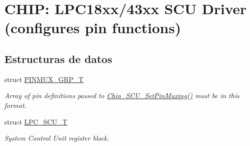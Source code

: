 \hypertarget{group___s_c_u__18_x_x__43_x_x}{}\section{C\+H\+IP\+: L\+P\+C18xx/43xx S\+CU Driver (configures pin functions)}
\label{group___s_c_u__18_x_x__43_x_x}
\subsection*{Estructuras de datos}
\begin{DoxyCompactItemize}
\item 
struct \hyperlink{struct_p_i_n_m_u_x___g_r_p___t}{P\+I\+N\+M\+U\+X\+\_\+\+G\+R\+P\+\_\+T}
\begin{DoxyCompactList}\small\item\em Array of pin definitions passed to \hyperlink{group___s_c_u__18_x_x__43_x_x_ga118ccc4ab5b115c5e8c7ce457eb85536}{Chip\+\_\+\+S\+C\+U\+\_\+\+Set\+Pin\+Muxing()} must be in this format. \end{DoxyCompactList}\item 
struct \hyperlink{struct_l_p_c___s_c_u___t}{L\+P\+C\+\_\+\+S\+C\+U\+\_\+T}
\begin{DoxyCompactList}\small\item\em System Control Unit register block. \end{DoxyCompactList}\end{DoxyCompactItemize}
